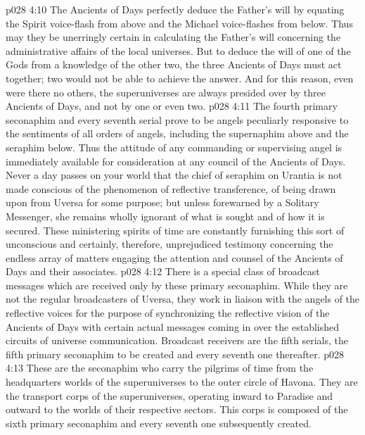 \vs p028 4:10 The Ancients of Days perfectly deduce the Father’s will by equating the Spirit voice\hyp{}flash from above and the Michael voice\hyp{}flashes from below. Thus may they be unerringly certain in calculating the Father’s will concerning the administrative affairs of the local universes. But to deduce the will of one of the Gods from a knowledge of the other two, the three Ancients of Days must act together; two would not be able to achieve the answer. And for this reason, even were there no others, the superuniverses are always presided over by three Ancients of Days, and not by one or even two.
\vs p028 4:11 \bibnobreakspace {} The fourth primary seconaphim and every seventh serial prove to be angels peculiarly responsive to the sentiments of all orders of angels, including the supernaphim above and the seraphim below. Thus the attitude of any commanding or supervising angel is immediately available for consideration at any council of the Ancients of Days. Never a day passes on your world that the chief of seraphim on Urantia is not made conscious of the phenomenon of reflective transference, of being drawn upon from Uversa for some purpose; but unless forewarned by a Solitary Messenger, she remains wholly ignorant of what is sought and of how it is secured. These ministering spirits of time are constantly furnishing this sort of unconscious and certainly, therefore, unprejudiced testimony concerning the endless array of matters engaging the attention and counsel of the Ancients of Days and their associates.
\vs p028 4:12 \bibnobreakspace {} There is a special class of broadcast messages which are received only by these primary seconaphim. While they are not the regular broadcasters of Uversa, they work in liaison with the angels of the reflective voices for the purpose of synchronizing the reflective vision of the Ancients of Days with certain actual messages coming in over the established circuits of universe communication. Broadcast receivers are the fifth serials, the fifth primary seconaphim to be created and every seventh one thereafter.
\vs p028 4:13 \bibnobreakspace {} These are the seconaphim who carry the pilgrims of time from the headquarters worlds of the superuniverses to the outer circle of Havona. They are the transport corps of the superuniverses, operating inward to Paradise and outward to the worlds of their respective sectors. This corps is composed of the sixth primary seconaphim and every seventh one subsequently created.
